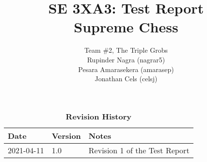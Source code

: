 \documentclass[12pt, titlepage]{article}
\title{SE 3XA3: Test Report\\Supreme Chess}
\author{Team \#2, The Triple Grobs
		\\ Rupinder Nagra (nagrar5)
		\\ Pesara Amarasekera (amarasep)
		\\ Jonathan Cels (celsj)
}
\begin{document}
\maketitle

\tableofcontents
\listoftables
\listoffigures

\begin{table}[bp]
    \caption{\bf Revision History}
    \begin{tabularx}{\textwidth}{p{3cm}p{2cm}X}
        \toprule {\bf Date} & {\bf Version} & {\bf Notes}\\
        \midrule
        2021-04-11 & 1.0 & Revision 1 of the Test Report\\
        \bottomrule
    \end{tabularx}
\end{table}

\newpage

\end{document}
